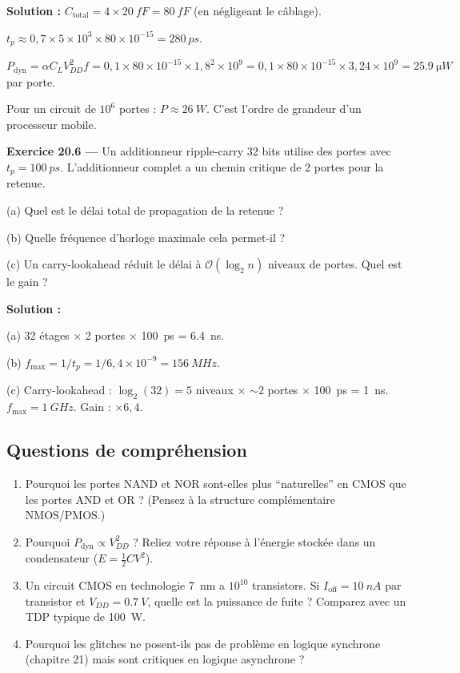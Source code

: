 \documentclass[12pt,a4paper,twoside]{book}
\begin{document}
\begin{pratique}
\textbf{Solution :} $C_{\text{total}} = 4\times\SI{20}{fF} = \SI{80}{fF}$ (en négligeant le câblage).

$t_p \approx 0{,}7\times5\times10^3\times80\times10^{-15} = \SI{280}{ps}$.

$P_{\text{dyn}} = \alpha C_L V_{DD}^2 f = 0{,}1\times80\times10^{-15}\times1{,}8^2\times10^9 = 0{,}1\times80\times10^{-15}\times3{,}24\times10^9 = \SI{25.9}{\micro W}$ par porte.

Pour un circuit de $10^6$ portes : $P \approx \SI{26}{W}$. C'est l'ordre de grandeur d'un processeur mobile.
\end{pratique}

\textbf{Exercice 20.6 ---} Un additionneur ripple-carry 32 bits utilise des portes avec $t_p = \SI{100}{ps}$. L'additionneur complet a un chemin critique de 2 portes pour la retenue.

(a) Quel est le délai total de propagation de la retenue ?

(b) Quelle fréquence d'horloge maximale cela permet-il ?

(c) Un carry-lookahead réduit le délai à $\mathcal{O}(\log_2 n)$ niveaux de portes. Quel est le gain ?

\begin{pratique}
\textbf{Solution :}

(a) 32 étages $\times$ 2 portes $\times$ \SI{100}{ps} = \SI{6.4}{ns}.

(b) $f_{\max} = 1/t_p = 1/6{,}4\times10^{-9} = \SI{156}{MHz}$.

(c) Carry-lookahead : $\log_2(32) = 5$ niveaux $\times$ $\sim 2$ portes $\times$ \SI{100}{ps} = \SI{1}{ns}. $f_{\max} = \SI{1}{GHz}$. Gain : $\times 6{,}4$.
\end{pratique}

\subsection*{Questions de compréhension}

\begin{enumerate}[nosep]
\item Pourquoi les portes NAND et NOR sont-elles plus ``naturelles'' en CMOS que les portes AND et OR ? (Pensez à la structure complémentaire NMOS/PMOS.)
\item Pourquoi $P_{\text{dyn}} \propto V_{DD}^2$ ? Reliez votre réponse à l'énergie stockée dans un condensateur ($E = \frac{1}{2}CV^2$).
\item Un circuit CMOS en technologie \SI{7}{nm} a $10^{10}$ transistors. Si $I_{\text{off}} = \SI{10}{nA}$ par transistor et $V_{DD} = \SI{0.7}{V}$, quelle est la puissance de fuite ? Comparez avec un TDP typique de \SI{100}{W}.
\item Pourquoi les glitches ne posent-ils pas de problème en logique synchrone (chapitre 21) mais sont critiques en logique asynchrone ?
\end{enumerate}
\end{document}
